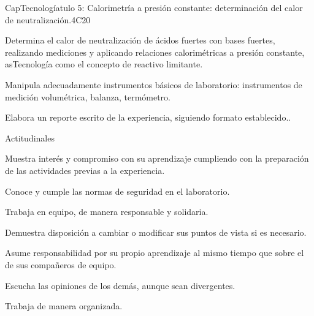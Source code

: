 \begin{syllabus}
\begin{unit}{CapTecnologíatulo 5:  Calorimetría a presión constante: determinación del calor de neutralización.}{}{}{4}{C20}
\begin{topics}
      \item Determina el calor de neutralización de ácidos fuertes con bases fuertes, realizando mediciones y aplicando relaciones calorimétricas a presión constante, asTecnología como el concepto de reactivo limitante.
      \item Manipula adecuadamente instrumentos básicos de laboratorio: instrumentos de medición volumétrica, balanza, termómetro.
      \item Elabora un reporte escrito de la experiencia, siguiendo formato establecido..
   \end{topics}
   
   Actitudinales

\begin{topics}
      \item Muestra interés y compromiso con su aprendizaje cumpliendo con la preparación de las actividades previas a la experiencia.
	  \item Conoce y cumple las normas de seguridad en el laboratorio.
	  \item Trabaja en equipo, de manera responsable y solidaria.
	  \item Demuestra disposición a cambiar o modificar sus puntos de vista si es necesario.
	  \item Asume responsabilidad por su propio aprendizaje al mismo tiempo que sobre el de sus compañeros de equipo.
	  \item Escucha las opiniones de los demás, aunque sean divergentes.
	  \item Trabaja de manera organizada.
   \end{topics}

   \begin{learningoutcomes}
      \item 
   \end{learningoutcomes}
   
\end{unit}



\begin{coursebibliography}
\end{coursebibliography}


\end{syllabus}
